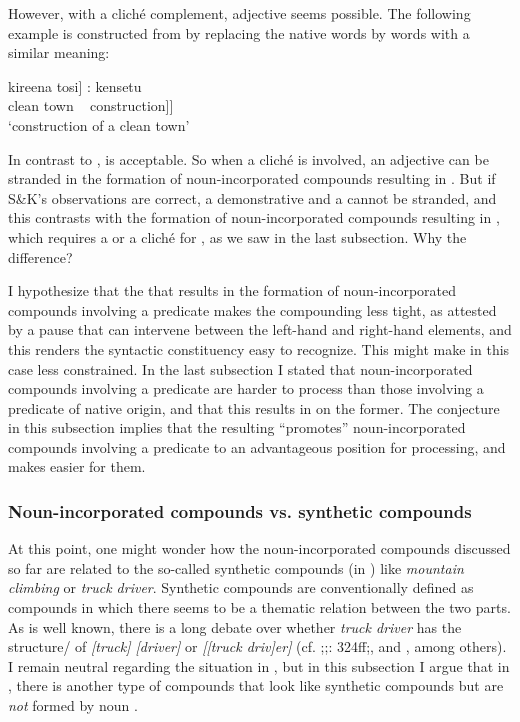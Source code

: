 \documentclass[output=paper]{LSP/langsci}
\begin{document}
However, with a cliché complement, adjective  seems possible. The following example is constructed from  by replacing the native words by  words with a similar meaning:

\ea\label{ex:nishiyama:28}
\gll {\ob}kireena tosi] : kensetu\\
     clean  town ~ construction]]\\
\glt ‘construction of a clean town’
\z

In contrast to ,  is acceptable. So when a cliché is involved, an adjective can be stranded in the formation of noun-incorporated compounds resulting in . But if S\&K's observations are correct, a demonstrative and a  cannot be stranded, and this contrasts with the formation of noun-incorporated compounds resulting in , which requires a  or a cliché for  , as we saw in the last subsection. Why the difference?

I hypothesize that the  that results in the formation of noun-incorporated compounds involving a  predicate makes the compounding less tight, as attested by a pause that can intervene between the left-hand and right-hand elements, and this renders the syntactic constituency easy to recognize. This might make   in this case less constrained. In the last subsection I stated that noun-incorporated compounds involving a  predicate are harder to process than those involving a predicate of native origin, and that this results in  on the former. The conjecture in this subsection implies that the resulting  “promotes” noun-incorporated compounds involving a  predicate to an advantageous position for processing, and makes   easier for them.

\subsubsection{Noun-incorporated compounds vs. synthetic compounds}\label{sec:nishiyama:3.2.3}

At this point, one might wonder how the noun-incorporated compounds discussed so far are related to the so-called synthetic compounds (in ) like \textit{mountain climbing} or \textit{truck driver}. Synthetic compounds are conventionally defined as compounds in which there seems to be a thematic relation between the two parts. As is well known, there is a long debate over whether \textit{truck driver} has the structure/ of \textit{[truck] [driver]} or \textit{[[truck driv]er]} (cf. \citealt{RoeperSiegel1978};\citealt{Lieber1983};\citealt{Spencer1991}: 324ff;\citealt{AckemaNeeleman2004}, and \citealt{Harley2009}, among others). I remain neutral regarding the situation in , but in this subsection I argue that in , there is another type of compounds that look like synthetic compounds but are \textit{not} formed by noun .
\end{document}
